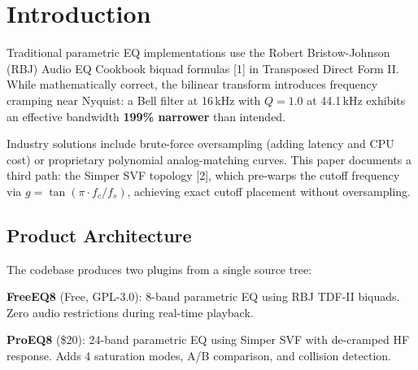 \documentclass[twoside,a4paper]{article}
\title{\papertitle}
\affiliation{\paperauthorA}{Independent Researcher (GareBear99 / TizWildin) \\ \url{https://github.com/GareBear99/FreeEQ8}\\{\tt gdoman99@gmail.com}}
\begin{document}
\ifpdf{}\else{}\fi
\maketitle

\begin{abstract}
We present FreeEQ8/ProEQ8, an open-source parametric equalizer implementing the Simper State Variable Filter (SVF) topology to eliminate high-frequency magnitude cramping without oversampling. Traditional RBJ biquad implementations exhibit 199\% Q distortion at 16\,kHz (44.1\,kHz sample rate); our SVF achieves exact response at all frequencies up to Nyquist. The architecture features lock-free SPSC triple-buffering for real-time safety, a variable-cadence coefficient engine reducing Dynamic EQ CPU cost by 75\%, and allocation-free semantic resonance detection. Measured performance: 0.62\% single-core CPU at 44.1\,kHz (161$\times$ headroom). Source code, benchmarks, and CI validation available under GPL-3.0.
\end{abstract}

\section{Introduction}
Traditional parametric EQ implementations use the Robert Bristow-Johnson (RBJ) Audio EQ Cookbook biquad formulas [1] in Transposed Direct Form II. While mathematically correct, the bilinear transform introduces frequency cramping near Nyquist: a Bell filter at 16\,kHz with $Q=1.0$ at 44.1\,kHz exhibits an effective bandwidth \textbf{199\% narrower} than intended.

Industry solutions include brute-force oversampling (adding latency and CPU cost) or proprietary polynomial analog-matching curves. This paper documents a third path: the Simper SVF topology [2], which pre-warps the cutoff frequency via $g = \tan(\pi \cdot f_c / f_s)$, achieving exact cutoff placement without oversampling.

\subsection{Product Architecture}
The codebase produces two plugins from a single source tree:

\textbf{FreeEQ8} (Free, GPL-3.0): 8-band parametric EQ using RBJ TDF-II biquads. Zero audio restrictions during real-time playback.

\textbf{ProEQ8} (\$20): 24-band parametric EQ using Simper SVF with de-cramped HF response. Adds 4 saturation modes, A/B comparison, and collision detection.
\end{document}
